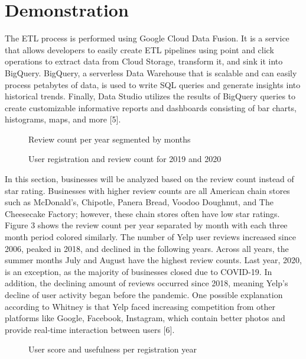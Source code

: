 \documentclass[11pt,journal,compsoc]{IEEEtran}
\begin{document}
\section{Demonstration}
The ETL process is performed using Google Cloud Data Fusion. It is a service that allows developers to easily create ETL pipelines using point and click operations to extract data from Cloud Storage, transform it, and sink it into BigQuery. BigQuery, a serverless Data Warehouse that is scalable and can easily process petabytes of data, is used to write SQL queries and generate insights into historical trends. Finally, Data Studio utilizes the results of BigQuery queries to create customizable informative reports and dashboards consisting of bar charts, histograms, maps, and more [5]. \\
\begin{figure*}[!t]
\centering
{}
\caption{Review count per year segmented by months}
\label{fig_first_case}
\end{figure*}
\begin{figure*}[!t]
\centering
{}
\caption{User registration and review count for 2019 and 2020}
\label{fig_sim}
\end{figure*}
\indent In this section, businesses will be analyzed based on the review count instead of star rating. Businesses with higher review counts are all American chain stores such as McDonald’s, Chipotle, Panera Bread, Voodoo Doughnut, and The Cheesecake Factory; however, these chain stores often have low star ratings. \\
\indent Figure 3 shows the review count per year separated by month with each three month period colored similarly. The number of Yelp user reviews increased since 2006, peaked in 2018, and declined in the following years. Across all years, the summer months July and August have the highest review counts. Last year, 2020, is an exception, as the majority of businesses closed due to COVID-19. In addition, the declining amount of reviews occurred since 2018, meaning Yelp’s decline of user activity began before the pandemic. One possible explanation according to Whitney is that Yelp faced increasing competition from other platforms like Google, Facebook, Instagram, which contain better photos and provide real-time interaction between users [6]. \\
\begin{figure*}[!t]
\centering
{}
\caption{User score and usefulness per registration year}
\label{fig_sim}
\end{figure*}
\end{document}

